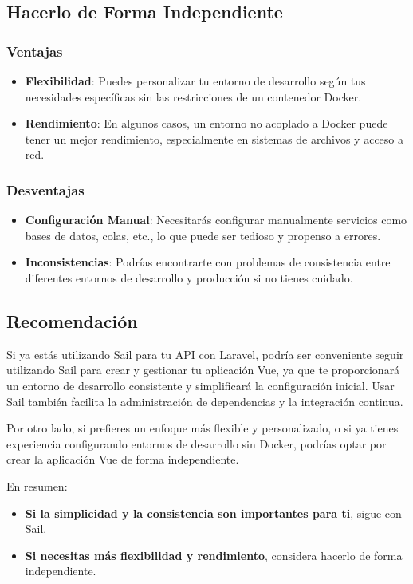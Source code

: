 \documentclass[11pt]{article}
\begin{document}
\subsection{Hacerlo de Forma Independiente}
\label{sec:org70d710e}

\subsubsection{Ventajas}
\label{sec:org6d5e7bd}
\begin{itemize}
\item \textbf{\textbf{Flexibilidad}}: Puedes personalizar tu entorno de desarrollo según
tus necesidades específicas sin las restricciones de un contenedor
Docker.
\item \textbf{\textbf{Rendimiento}}: En algunos casos, un entorno no acoplado a Docker
puede tener un mejor rendimiento, especialmente en sistemas de
archivos y acceso a red.
\end{itemize}

\subsubsection{Desventajas}
\label{sec:orgf4aaf79}
\begin{itemize}
\item \textbf{\textbf{Configuración Manual}}: Necesitarás configurar manualmente
servicios como bases de datos, colas, etc., lo que puede ser tedioso
y propenso a errores.
\item \textbf{\textbf{Inconsistencias}}: Podrías encontrarte con problemas de
consistencia entre diferentes entornos de desarrollo y producción si
no tienes cuidado.
\end{itemize}

\subsection{Recomendación}
\label{sec:org5c7cac9}

Si ya estás utilizando Sail para tu API con Laravel, podría ser
conveniente seguir utilizando Sail para crear y gestionar tu
aplicación Vue, ya que te proporcionará un entorno de desarrollo
consistente y simplificará la configuración inicial. Usar Sail también
facilita la administración de dependencias y la integración continua.

Por otro lado, si prefieres un enfoque más flexible y personalizado, o
si ya tienes experiencia configurando entornos de desarrollo sin
Docker, podrías optar por crear la aplicación Vue de forma
independiente.

En resumen:
\begin{itemize}
\item \textbf{\textbf{Si la simplicidad y la consistencia son importantes para ti}},
sigue con Sail.
\item \textbf{\textbf{Si necesitas más flexibilidad y rendimiento}}, considera hacerlo
de forma independiente.
\end{itemize}
\end{document}
